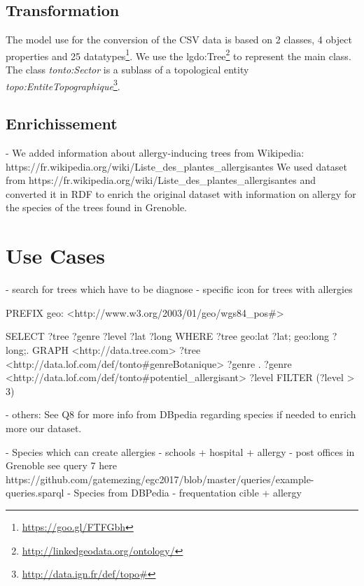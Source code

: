 \documentclass[a4paper,pagenum,english]{rnti}
\begin{document}
{\subsection{Transformation}
The model use for the conversion of the CSV data is based on 2 classes, 4 object properties and 25 datatypes\footnote{\url{https://goo.gl/FTFGbh}}.  
We use the lgdo:Tree\footnote{\url{http://linkedgeodata.org/ontology/}} to represent the main class. The class \textit{tonto:Sector} is a sublass of a topological entity \textit{topo:EntiteTopographique}\footnote{\url{http://data.ign.fr/def/topo#}}. 


\subsection{Enrichissement}
	- We added information about allergy-inducing trees from Wikipedia: https://fr.wikipedia.org/wiki/Liste_des_plantes_allergisantes
We used dataset from https://fr.wikipedia.org/wiki/Liste_des_plantes_allergisantes and converted it in RDF to enrich the original dataset with information on allergy for the species of the trees found in Grenoble. 

\section{Use Cases}
- search for trees which have to be diagnose
- specific icon for trees with allergies

PREFIX geo: <http://www.w3.org/2003/01/geo/wgs84_pos#>

SELECT ?tree ?genre ?level ?lat ?long
WHERE {
  ?tree geo:lat ?lat;
        geo:long ?long;.
  GRAPH <http://data.tree.com> {
    ?tree <http://data.lof.com/def/tonto#genreBotanique> ?genre .
    ?genre <http://data.lof.com/def/tonto#potentiel_allergisant> ?level }
  FILTER (?level > 3)
}

- others: See Q8 for more info from DBpedia regarding species if needed to enrich more our dataset.

- Species which can create allergies
- schools + hospital + allergy
- post offices in Grenoble  see query 7 here https://github.com/gatemezing/egc2017/blob/master/queries/example-queries.sparql 
- Species from DBPedia
- frequentation cible + allergy

}
\end{document}
